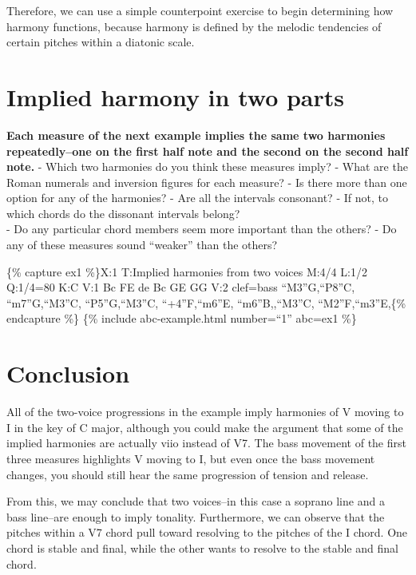 \documentclass{book}
\begin{document}
Therefore, we can use a simple counterpoint exercise to begin determining how
harmony functions, because harmony is defined by the melodic tendencies of
certain pitches within a diatonic scale.

\hypertarget{implied-harmony-in-two-parts}{%
\section{Implied harmony in two parts}\label{implied-harmony-in-two-parts}}

\textbf{Each measure of the next example implies the same two harmonies
repeatedly--one on the first half note and the second on the second half
note.} - Which two harmonies do you think these measures imply? - What are the
Roman numerals and inversion figures for each measure? - Is there more than
one option for any of the harmonies? - Are all the intervals consonant? - If
not, to which chords do the dissonant intervals belong?\\
- Do any particular chord members seem more important than the others? - Do
any of these measures sound ``weaker'' than the others?

\{\% capture ex1 \%\}X:1 T:Implied harmonies from two voices M:4/4 L:1/2
Q:1/4=80 K:C V:1 Bc\textbar\textbar{} FE\textbar\textbar{}
de\textbar\textbar{} Bc\textbar\textbar{} GE\textbar\textbar{} GG\textbar{]}
V:2 clef=bass ``M3''G,``P8''C,\textbar\textbar{}
``m7''G,``M3''C,\textbar\textbar{} ``P5''G,``M3''C,\textbar\textbar{}
``+4''F,``m6''E,\textbar\textbar{} ``m6''B,,``M3''C,\textbar\textbar{}
``M2''F,``m3''E,\textbar{]}\{\% endcapture \%\} \{\% include abc-example.html
number=``1'' abc=ex1 \%\}

\hypertarget{conclusion-8}{%
\section{Conclusion}\label{conclusion-8}}

All of the two-voice progressions in the example imply harmonies of V moving
to I in the key of C major, although you could make the argument that some of
the implied harmonies are actually viio instead of V7. The bass movement of
the first three measures highlights V moving to I, but even once the bass
movement changes, you should still hear the same progression of tension and
release.

From this, we may conclude that two voices--in this case a soprano line and a
bass line--are enough to imply tonality. Furthermore, we can observe that the
pitches within a V7 chord pull toward resolving to the pitches of the I chord.
One chord is stable and final, while the other wants to resolve to the stable
and final chord.
\end{document}
